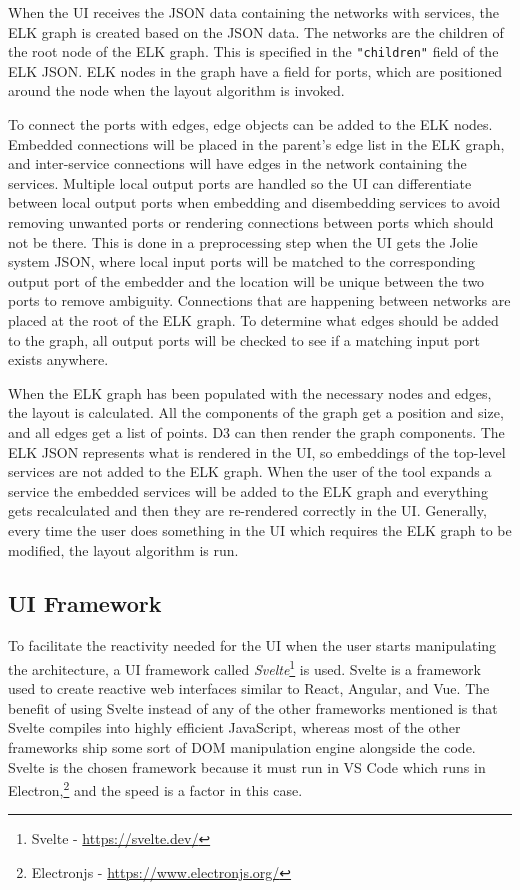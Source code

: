 When the UI receives the JSON data containing the networks with services, the ELK graph is created based on the JSON data.
The networks are the children of the root node of the ELK graph. This is specified in the \texttt{"children"} field of the ELK JSON.
ELK nodes in the graph have a field for ports, which are positioned around the node when the layout algorithm is invoked.

To connect the ports with edges, edge objects can be added to the ELK nodes. Embedded connections will be placed in the parent's edge list in the ELK graph, and inter-service connections will have edges in the network containing the services.
Multiple local output ports are handled so the UI can differentiate between local output ports when embedding and disembedding services to avoid removing unwanted ports or rendering connections between ports which should not be there.
This is done in a preprocessing step when the UI gets the Jolie system JSON, where local input ports will be matched to the corresponding output port of the embedder and the location will be unique between the two ports to remove ambiguity.
Connections that are happening between networks are placed at the root of the ELK graph. To determine what edges should be added to the graph, all output ports will be checked to see if a matching input port exists anywhere.

When the ELK graph has been populated with the necessary nodes and edges, the layout is calculated. All the components of the graph get a position and size, and all edges get a list of points. D3 can then render the graph components.
The ELK JSON represents what is rendered in the UI, so embeddings of the top-level services are not added to the ELK graph. When the user of the tool expands a service the embedded services will be added to the ELK graph and
everything gets recalculated and then they are re-rendered correctly in the UI. Generally, every time the user does something in the UI which requires the ELK graph to be modified, the layout algorithm is run.

\subsection{UI Framework}
To facilitate the reactivity needed for the UI when the user starts manipulating the architecture, a UI framework called \emph{Svelte}\footnote{Svelte - \url{https://svelte.dev/}} is used.
Svelte is a framework used to create reactive web interfaces similar to React, Angular, and Vue. The benefit of using Svelte instead of any of the other frameworks mentioned is that Svelte compiles into highly efficient JavaScript,
whereas most of the other frameworks ship some sort of DOM manipulation engine alongside the code. Svelte is the chosen framework because it must run in VS Code which runs in Electron,\footnote{Electronjs - \url{https://www.electronjs.org/}} and the speed is a factor in this case.

